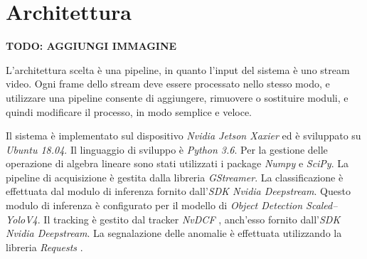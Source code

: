 \chapter{Architettura}
\label{sec:architettura}

\textbf{TODO: AGGIUNGI IMMAGINE}

L'architettura scelta è una pipeline, in quanto l'input del sistema è uno stream video.
Ogni frame dello stream deve essere processato nello stesso modo, e utilizzare una pipeline consente di aggiungere, rimuovere o sostituire moduli, e quindi modificare il processo, in modo semplice e veloce.

Il sistema è implementato sul dispositivo \emph{Nvidia Jetson Xaxier}\cite{arch:jetson} ed è sviluppato su \emph{Ubuntu 18.04}\cite{arch:ubuntu}.
Il linguaggio di sviluppo è \emph{Python 3.6}\cite{arch:python}.
Per la gestione delle operazione di algebra lineare sono stati utilizzati i package \emph{Numpy}\cite{arch:numpy} e \emph{SciPy}\cite{arch:scipy}.
La pipeline di acquisizione è gestita dalla libreria \emph{GStreamer}\cite{arch:gstreamer}.
La classificazione è effettuata dal modulo di inferenza fornito dall'\emph{SDK Nvidia Deepstream}\cite{arch:deepstream}.
Questo modulo di inferenza è configurato per il modello di \emph{Object Detection Scaled--YoloV4}\cite{yolocsp}.
Il tracking è gestito dal tracker \emph{NvDCF} \cite{nvdcf}, anch'esso fornito dall'\emph{SDK Nvidia Deepstream}.
La segnalazione delle anomalie è effettuata utilizzando la libreria \emph{Requests} \cite{arch:requests}.
